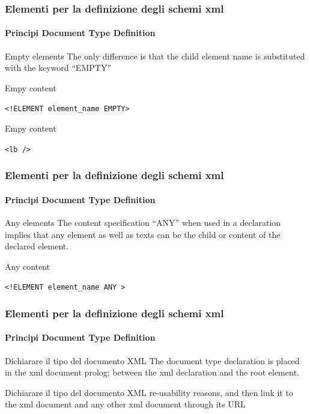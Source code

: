 \begin{frame}
    \frametitle{Elementi per la definizione degli schemi xml}
    \framesubtitle{Principi Document Type Definition}
    \addtocounter{nframe}{1}

    \begin{block}{Empty elements}
    The only difference is that the child element name is substituted with the keyword “EMPTY”  
    \end{block}

    \begin{block}{Empy content}
    \begin{center}\texttt{<!ELEMENT element_name EMPTY>}\end{center}
    \end{block}


    \begin{block}{Empy content}
    \begin{center}\texttt{<lb />}\end{center}
    \end{block}
    
    

\end{frame}


\begin{frame}
    \frametitle{Elementi per la definizione degli schemi xml}
    \framesubtitle{Principi Document Type Definition}
    \addtocounter{nframe}{1}

    \begin{block}{Any elements}
 The content specification ``ANY'' when used in a declaration implies that any element as well as texts can be the child or content of the declared element.

    \end{block}

    \begin{block}{Any content}
    \begin{center}\texttt{<!ELEMENT element_name ANY >}\end{center}
    \end{block}
    
\end{frame}


\begin{frame}
    \frametitle{Elementi per la definizione degli schemi xml}
    \framesubtitle{Principi Document Type Definition}
    \addtocounter{nframe}{1}

    \begin{block}{Dichiarare il tipo del documento XML}
        The document type declaration is placed in the xml document prolog; between
         the xml declaration and the root element.

    \end{block}

    \begin{block}{Dichiarare il tipo del documento XML}
        re-usability reasons, and then link it to the xml document and any other xml document through its URL
    \end{block}

\end{frame}


